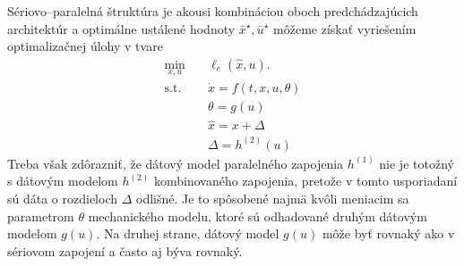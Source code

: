 Sériovo--paralelná štruktúra je akousi kombináciou oboch predchádzajúcich architektúr a optimálne ustálené hodnoty $ \bar{x}^{\star}, \bar{u}^{\star} $ môžeme získať vyriešením  optimalizačnej úlohy v tvare
\begin{equation}
	\begin{split}
		\min_{x,u} &\quad \ell_e\left(\hat{x},u\right).\\
		\text{s.t.} &\quad \dot{x} = f\left(t,x,u,\theta\right)\\
		&\quad \theta = g(u) \\
		&\quad \hat{x} = x + \Delta\\
		&\quad \Delta = h^{(2)}(u)
	\end{split}
\end{equation}
Treba však zdôrazniť, že dátový model paralelného zapojenia $ h^{(1)} $ nie je totožný s dátovým modelom $ h^{(2)} $ kombinovaného zapojenia, pretože v tomto usporiadaní sú dáta o rozdieloch $ \Delta $ odlišné. Je to spôsobené najmä kvôli meniacim sa parametrom $ \theta $ mechanického modelu, ktoré sú odhadované druhým dátovým modelom $ g(u) $. Na druhej strane, dátový model $ g(u) $ môže byť rovnaký ako v sériovom zapojení a často aj býva rovnaký. 
